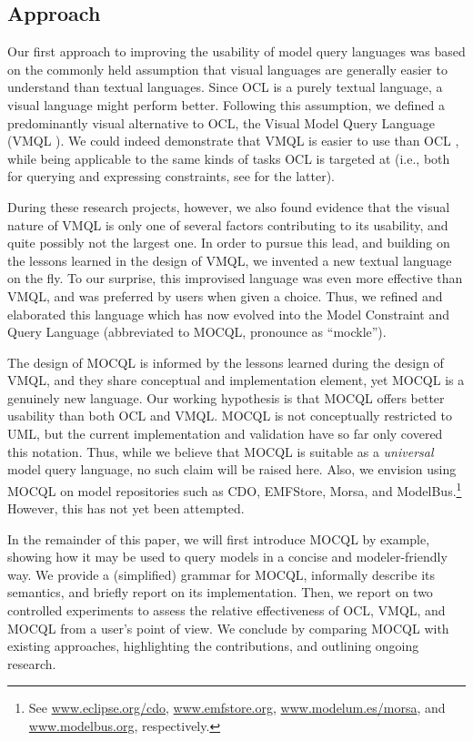 \documentclass{llncs}
\newcommand{\MMQ}{MOCQL\xspace}
\begin{document}
\subsection{Approach}\label{sec:Approach}

Our first approach to improving the usability of model query languages was based on the commonly held assumption that visual languages are generally easier to understand than textual languages. Since OCL is a purely textual language, a visual language might perform better. Following this assumption, we defined a predominantly visual alternative to OCL, the  Visual Model Query Language (VMQL \cite{stoerrle:mq3:vlhcc09}). We could indeed demonstrate that VMQL is easier to use than OCL \cite{stoerrle:mq3b:jvlc}, while being applicable to the same kinds of tasks OCL is targeted at (i.e., both for querying and expressing constraints, see \cite{stoerrle:mq4b:expressing:vlhcc} for the latter). 

During these research projects, however, we also found evidence that the visual nature of VMQL is only one of several factors contributing to its usability, and quite possibly not the largest one. In order to pursue this lead, and building on the lessons learned in the design of VMQL, we invented a new textual language on the fly. To our surprise, this improvised language was even more effective than VMQL, and was preferred by users when given a choice. Thus, we refined and elaborated this language which has now evolved into the Model Constraint and Query Language (abbreviated to \MMQ, pronounce as ``mockle''). 

The design of \MMQ is informed by the lessons learned during the design of VMQL, and they share conceptual and implementation element, yet \MMQ is a genuinely new language. Our working hypothesis is that \MMQ offers better usability than both OCL and VMQL. \MMQ is not conceptually restricted to UML, but the current implementation and validation have so far only covered this notation. Thus, while we believe that \MMQ is suitable as a \emph{universal} model query language, no such claim will be raised here. Also, we envision using \MMQ on model repositories such as CDO, EMFStore, Morsa, and ModelBus.\footnote{See \url{www.eclipse.org/cdo}, \url{www.emfstore.org}, \url{www.modelum.es/morsa}, and \url{www.modelbus.org}, respectively.} However, this has not yet been attempted.

In the remainder of this paper, we will first introduce \MMQ by example, showing how it may be used to query models in a concise and modeler-friendly way. We provide a (simplified) grammar for \MMQ, informally describe its semantics, and briefly report on its implementation. Then, we report on two controlled experiments to assess the relative effectiveness of OCL, VMQL, and \MMQ from a user's point of view. We conclude by comparing \MMQ with existing approaches, highlighting the contributions, and outlining ongoing research.
\end{document}
